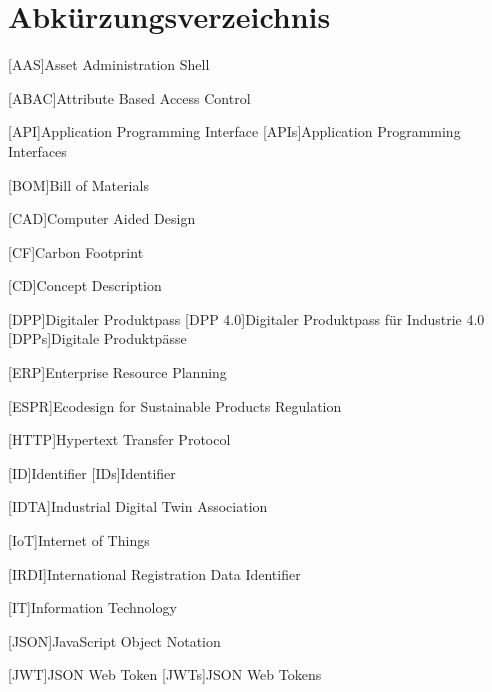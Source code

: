 \section*{Abkürzungsverzeichnis}
{}
\vspace{0.6\baselineskip}
{

\begin{singlespacing}
\end{singlespacing}
\begin{acronym}[RAMI 4.0]

\setlength{\itemsep}{1\baselineskip}
\setlength{\parskip}{0pt}
\setlength{\parsep}{0pt}

[AAS]{Asset Administration Shell}

[ABAC]{Attribute Based Access Control}

[API]{Application Programming Interface}
[APIs]{Application Programming Interfaces}

[BOM]{Bill of Materials}

[CAD]{Computer Aided Design}

[CF]{Carbon Footprint}

[CD]{Concept Description}

[DPP]{Digitaler Produktpass}
[DPP 4.0]{Digitaler Produktpass für Industrie 4.0}
[DPPs]{Digitale Produktpässe}

[ERP]{Enterprise Resource Planning}

[ESPR]{Ecodesign for Sustainable Products Regulation}

[HTTP]{Hypertext Transfer Protocol}

[ID]{Identifier}
[IDs]{Identifier}

[IDTA]{Industrial Digital Twin Association}

[IoT]{Internet of Things}

[IRDI]{International Registration Data Identifier}

[IT]{Information Technology}

[JSON]{JavaScript Object Notation}

[JWT]{JSON Web Token}
[JWTs]{JSON Web Tokens}


\end{acronym}}
